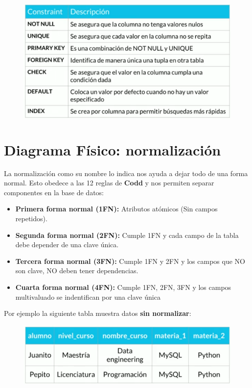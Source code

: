 \documentclass{article}
\begin{document}
\begin{figure}[h!]
    \centering
      \includegraphics[scale=0.5]{./Pictures/021_constraints.png}
\end{figure}


\section{Diagrama Físico: normalización}%
La normalización como su nombre lo indica nos ayuda a dejar todo de una forma
normal. Esto obedece a las 12 reglas de \textbf{Codd} y nos permiten separar
componentes en la base de datos:\\

\begin{itemize}
  \item \textbf{Primera forma normal (1FN):} Atributos atómicos (Sin campos repetidos).
  \item \textbf{Segunda forma normal (2FN):} Cumple 1FN y cada campo de la
    tabla debe depender de una clave única.
  \item \textbf{Tercera forma normal (3FN):} Cumple 1FN y 2FN y los campos que
    NO son clave, NO deben tener dependencias.
  \item \textbf{Cuarta forma normal (4FN):} Cumple 1FN, 2FN, 3FN y los campos
    multivaluado se indentifican por una clave única
\end{itemize}

\newpage
Por ejemplo la siguiente tabla muestra datos \textbf{sin normalizar}:

\begin{figure}[h!]
    \centering
      \includegraphics[scale=0.45]{./Pictures/022_sin_normalizar.png}
\end{figure}
\end{document}
